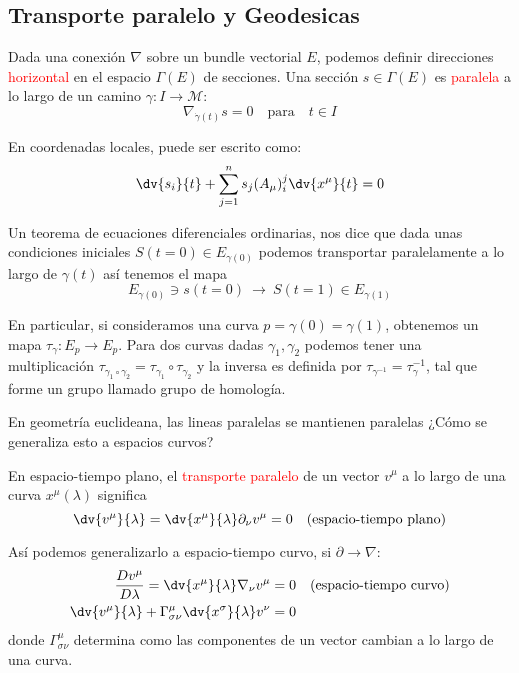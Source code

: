 \documentclass[../main]{subfiles}
\begin{document}
\begin{adjustwidth}{0pt}{-100pt}
\section{Transporte paralelo y Geodesicas}\label{part4.4}

Dada una conexión $\nabla$ sobre un bundle vectorial $E$, podemos definir direcciones \textcolor{red}{horizontal} en el espacio $\Gamma(E)$ de secciones. Una sección $s \in \Gamma(E)$ es \textcolor{red}{paralela} a lo largo de un camino $\gamma: I \rightarrow \mathcal{M}$:
\begin{equation}
    \nabla_{\dot{\gamma}(t)}s=0 \quad \text{para} \quad t\in I
\end{equation}

En coordenadas locales, puede ser escrito como:
\begin{equation}
    \dv{s_i}{t}+\sum_{j=1}^n s_j(A_{\mu})^j_i \dv{x^{\mu}}{t}=0
\end{equation}

Un teorema de ecuaciones diferenciales ordinarias, nos dice que dada unas condiciones iniciales $S(t=0) \in E_{\gamma(0)}$ podemos transportar paralelamente a lo largo de $\gamma(t)$ así tenemos el mapa 
\begin{equation}
    E_{\gamma(0)} \ni s(t=0) \ \rightarrow \ S(t=1) \in E_{\gamma(1)}
\end{equation}

En particular, si consideramos una curva $p=\gamma(0)=\gamma(1)$, obtenemos un mapa $\tau_{\gamma}: E_p \rightarrow E_p$. Para dos curvas dadas $\gamma_1, \gamma_2$ podemos tener una multiplicación $\tau_{\gamma_1 \circ \gamma_2}=\tau_{\gamma_1}\circ \tau_{\gamma_2}$ y la inversa es definida por $\tau_{\gamma^{-1}}=\tau^{-1}_{\gamma}$, tal que forme un grupo llamado grupo de homología.

En geometría euclideana, las lineas paralelas se mantienen paralelas ¿Cómo se generaliza esto a espacios curvos?

En espacio-tiempo plano, el \textcolor{red}{transporte paralelo} de un vector $v^{\mu}$ a lo largo de una curva $x^{\mu}(\lambda)$ significa 
\begin{equation}
    \dv{v^{\mu}}{\lambda}=\dv{x^{\mu}}{\lambda}\partial_{\nu}v^{\mu}=0 \quad (\text{espacio-tiempo plano})
\end{equation}

Así podemos generalizarlo a espacio-tiempo curvo, si $\partial \rightarrow \nabla$:
\begin{equation}
    \begin{aligned}
        \dfrac{D v^{\mu}}{D\lambda}=\dv{x^{\mu}}{\lambda}\nabla_{\nu}v^{\mu}&=0 \quad (\text{espacio-tiempo curvo})\\
        \dv{v^{\mu}}{\lambda}+\Gamma^{\mu}_{\sigma\nu}\dv{x^{\sigma}}{\lambda}v^{\nu}&=0
    \end{aligned}
\end{equation}
donde $\Gamma^{\mu}_{\sigma\nu}$ determina como las componentes de un vector cambian a lo largo de una curva.


\end{adjustwidth}
\end{document}

